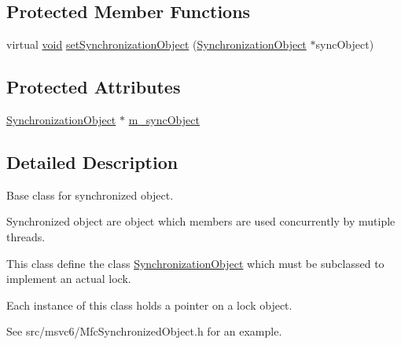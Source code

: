 \subsection*{Protected Member Functions}
\begin{DoxyCompactItemize}
\item 
virtual \hyperlink{wglew_8h_aeea6e3dfae3acf232096f57d2d57f084}{void} \hyperlink{class_synchronized_object_a72f0856ba79569fea9907916e085c555}{set\-Synchronization\-Object} (\hyperlink{class_synchronized_object_1_1_synchronization_object}{Synchronization\-Object} $\ast$sync\-Object)
\end{DoxyCompactItemize}
\subsection*{Protected Attributes}
\begin{DoxyCompactItemize}
\item 
\hyperlink{class_synchronized_object_1_1_synchronization_object}{Synchronization\-Object} $\ast$ \hyperlink{class_synchronized_object_a51605ed5ba10c06e795f21a98ea5ef37}{m\-\_\-sync\-Object}
\end{DoxyCompactItemize}


\subsection{Detailed Description}
Base class for synchronized object. 

Synchronized object are object which members are used concurrently by mutiple threads.

This class define the class \hyperlink{class_synchronized_object_1_1_synchronization_object}{Synchronization\-Object} which must be subclassed to implement an actual lock.

Each instance of this class holds a pointer on a lock object.

See src/msvc6/\-Mfc\-Synchronized\-Object.\-h for an example. 

